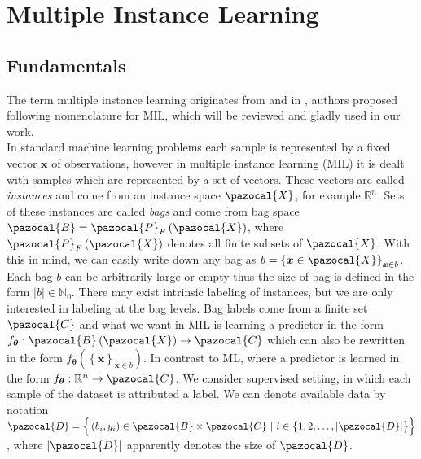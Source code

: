 \chapter{Multiple Instance Learning}
\section{Fundamentals}
The term multiple instance learning originates from \cite{MILfirstly} and in \cite{mandlik}, authors proposed following nomenclature for MIL, which will be reviewed and gladly used in our work. \\
In standard machine learning problems each sample is represented by a fixed vector $\boldsymbol{x}$ of observations, however in multiple instance learning (MIL) it is dealt with samples which are represented by a set of vectors. These vectors are called \emph{instances} and come from an instance space $\pazocal{X}$, for example $\mathbb{R}^n$. Sets of these instances are called \emph{bags} and come from bag space $\pazocal{B} = \pazocal{P}_F\left(\pazocal{X}\right)$, where $\pazocal{P}_F\left(\pazocal{X}\right)$ denotes all finite subsets of $\pazocal{X}$. With this in mind, we can easily write down any bag as $b = \left\lbrace \boldsymbol{x} \in  \pazocal{X} \right\rbrace_{\boldsymbol{x} \in b}$. Each bag $b$ can be arbitrarily large or empty thus the size of bag is defined in the form $\vert b\vert \in \mathbb{N}_0$. There may exist intrinsic labeling of instances, but we are only interested in labeling at the bag levels. Bag labels come from a finite set $\pazocal{C}$ and what we want in MIL is learning a predictor in the form $f_{\boldsymbol{\theta}}: \pazocal{B}\left(\pazocal{X}\right) \rightarrow \pazocal{C}$ which can also be rewritten in the form $f_{\boldsymbol{\theta}}\left(\left\lbrace \boldsymbol{x}\right\rbrace_{\boldsymbol{x}\in b}\right)$. In contrast to ML, where a predictor is learned in the form  $f_{\boldsymbol{\theta}}: \mathbb{R}^n \rightarrow \pazocal{C}$.  We consider supervised setting, in which each sample of the dataset is attributed a label. We can denote available data by notation $\pazocal{D} = \Big\lbrace \left(b_i, y_i\right) \in \pazocal{B}\times\pazocal{C} \ | \ i \in \big\lbrace 1,2,\dots,\vert \pazocal{D} \vert \big\rbrace \Big\rbrace$, where $\vert \pazocal{D} \vert$ apparently denotes the size of $\pazocal{D}$. 
